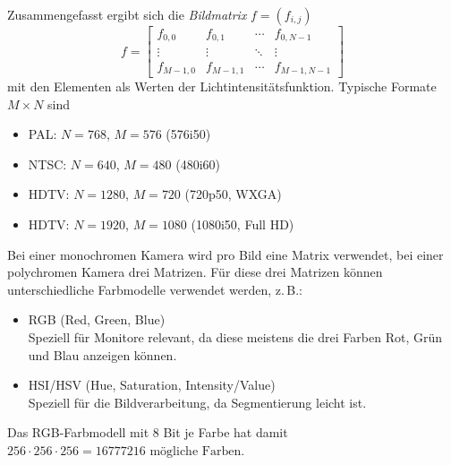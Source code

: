 				Zusammengefasst ergibt sich die \emph{Bildmatrix} \( f = (f_{i, j}) \)
				\begin{equation*}
					f =
						\begin{bmatrix}
							f_{0, 0}     & f_{0, 1}     & \cdots & f_{0, N - 1}     \\
							\vdots       & \vdots       & \ddots & \vdots           \\
							f_{M - 1, 0} & f_{M - 1, 1} & \cdots & f_{M - 1, N - 1}
						\end{bmatrix}
				\end{equation*}
				mit den Elementen als Werten der Lichtintensitätsfunktion. Typische Formate \( M \times N \) sind
				\begin{itemize}
					\item PAL:  \tabto{1.5cm} \( N = \num{768} \),  \tabto{3.5cm} \( M = \num{576} \)  \tabto{5.5cm} (576i50)
					\item NTSC: \tabto{1.5cm} \( N = \num{640} \),  \tabto{3.5cm} \( M = \num{480} \)  \tabto{5.5cm} (480i60)
					\item HDTV: \tabto{1.5cm} \( N = \num{1280} \), \tabto{3.5cm} \( M = \num{720} \)  \tabto{5.5cm} (720p50, WXGA)
					\item HDTV: \tabto{1.5cm} \( N = \num{1920} \), \tabto{3.5cm} \( M = \num{1080} \) \tabto{5.5cm} (1080i50, Full HD)
				\end{itemize}
				Bei einer monochromen Kamera wird pro Bild eine Matrix verwendet, bei einer polychromen Kamera drei Matrizen. Für diese drei Matrizen können unterschiedliche Farbmodelle verwendet werden, z.\,B.:
				\begin{itemize}
					\item RGB (Red, Green, Blue) \\ Speziell für Monitore relevant, da diese meistens die drei Farben Rot, Grün und Blau anzeigen können.
					\item HSI/HSV (Hue, Saturation, Intensity/Value) \\ Speziell für die Bildverarbeitung, da Segmentierung leicht ist.
				\end{itemize}
				Das RGB-Farbmodell mit \num{8} Bit je Farbe hat damit \( \num{256} \cdot \num{256} \cdot \num{256} = \num{16777216}\text{ mögliche Farben} \).
				
